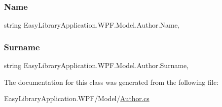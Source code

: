 \subsubsection{\texorpdfstring{Name}{Name}}
{\footnotesize\ttfamily string Easy\+Library\+Application.\+W\+P\+F.\+Model.\+Author.\+Name\hspace{0.3cm}{\ttfamily [get]}, {\ttfamily [set]}}

\mbox{\label{class_easy_library_application_1_1_w_p_f_1_1_model_1_1_author_a37de5602f808f364230a3e6ee9ee8b79}} 
\subsubsection{\texorpdfstring{Surname}{Surname}}
{\footnotesize\ttfamily string Easy\+Library\+Application.\+W\+P\+F.\+Model.\+Author.\+Surname\hspace{0.3cm}{\ttfamily [get]}, {\ttfamily [set]}}



The documentation for this class was generated from the following file\+:\begin{DoxyCompactItemize}
\item 
Easy\+Library\+Application.\+W\+P\+F/\+Model/\mbox{\hyperlink{_author_8cs}{Author.\+cs}}\end{DoxyCompactItemize}
